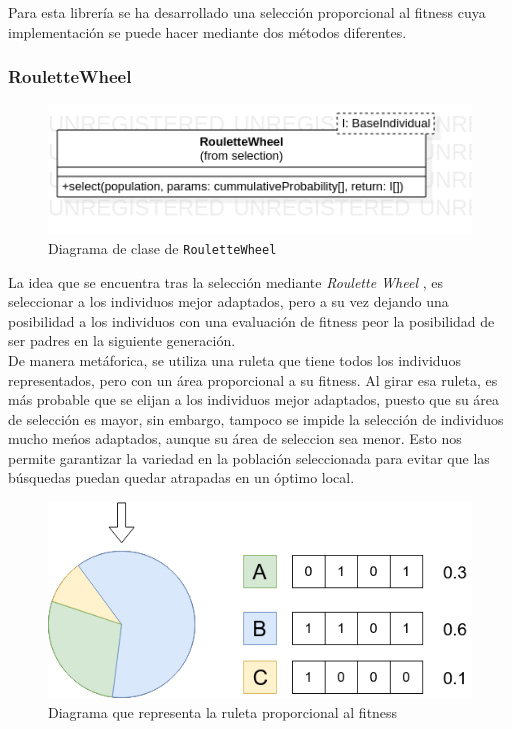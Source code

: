 Para esta librería se ha desarrollado una selección proporcional al fitness cuya implementación se puede hacer mediante dos métodos diferentes.

\subsubsection{RouletteWheel}

\begin{figure}[H]
    \centering
    \includegraphics[scale=0.7]{mem/images/cap-4/4.2.5(Selection)/RouletteWheel.png}
    \caption{Diagrama de clase de \texttt{RouletteWheel}}
    \label{fig:generator-uml}
\end{figure}


La idea que se encuentra tras la selección mediante \textit{Roulette Wheel} \cite{DBLP:journals/corr/abs-1109-3627}, es seleccionar a los individuos mejor adaptados, pero a su vez dejando una posibilidad a los individuos con una evaluación de fitness peor la posibilidad de ser padres en la siguiente generación. \\

De manera metáforica, se utiliza una ruleta que tiene todos los individuos representados, pero con un área proporcional a su fitness. Al girar esa ruleta, es más probable que se elijan a los individuos mejor adaptados, puesto que su área de selección es mayor, sin embargo, tampoco se impide la selección de individuos mucho meńos adaptados, aunque su área de seleccion sea menor. Esto nos permite garantizar la variedad en la población seleccionada para evitar que las búsquedas puedan quedar atrapadas en un óptimo local. \\

\begin{figure}[ht]
    \centering
    \includegraphics[scale=0.5]{mem/images/cap-4/4.2.5(Selection)/RouletteWheel-1.png}
    \caption{Diagrama que representa la ruleta proporcional al fitness}
    \label{fig:roulette-wheel-example}
\end{figure}

